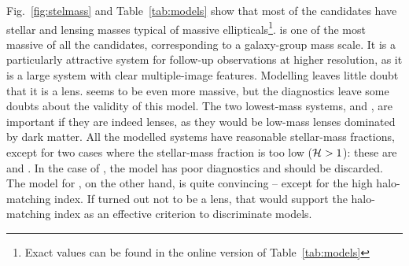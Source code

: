 Fig.~\ref{fig:stelmass} and Table~\ref{tab:models} show that most of the
candidates have stellar
and lensing masses typical of massive ellipticals\footnote{
  Exact values can be found in the online version of Table~\ref{tab:models}}.
 is one of the most massive of all the candidates, corresponding
to a galaxy-group mass scale.  It is a particularly attractive system
for follow-up observations at higher resolution, as it is a large
system with clear multiple-image features. Modelling leaves little
doubt that it is a lens.   seems to be even more massive, but the
diagnostics leave some doubts about the validity of this model.  The
two lowest-mass systems,  and , are important if they are
indeed lenses, as they would be low-mass lenses dominated by dark
matter.  All the modelled systems have reasonable stellar-mass
fractions, except for two cases where the stellar-mass fraction is too
low ($\mathcal{H} > 1$): these are  and .  In the case of ,
the model has poor diagnostics and should be discarded.  The model
for , on the other hand, is quite convincing -- except for the
high halo-matching index.  If  turned out not to be a lens, that
would support the halo-matching index as an effective criterion to
discriminate models.

